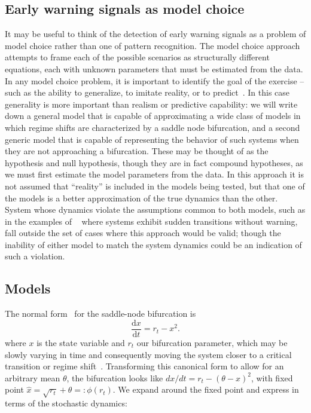 \documentclass[authoryear,review,11pt]{elsarticle}
\newcommand{\ud}{\mathrm{d}}
\begin{document}
\subsection*{Early warning signals as model choice}
It may be useful to think of the detection of early warning signals 
as a problem of model choice rather than one of pattern recognition.  
The model choice approach attempts to frame each of the possible scenarios as structurally different equations,
each with unknown parameters that must be estimated from the data.
In any model choice problem, it is important to identify the goal of the exercise --
such as the ability to generalize, to imitate reality, or to predict~\citep{Levins1966}.  
In this case generality is more important than realism or predictive capability: 
we will write down a general model that is capable of approximating
a wide class of models in which regime shifts are characterized by a saddle node bifurcation,
and a second generic model that is capable of representing the behavior of such systems
when they are not approaching a bifurcation.  
These may be thought of as the hypothesis and null hypothesis,
though they are in fact compound hypotheses,
as we must first estimate the model parameters from the data.  
In this approach it is not assumed that ``reality'' is included in the models being tested, 
but that one of the models is a better approximation of the true dynamics than the other.  
System whose dynamics violate the assumptions common to both models, 
such as in the examples of ~\citet{Hastings2010} where systems exhibit sudden transitions without warning, 
fall outside the set of cases where this approach would be valid; 
though the inability of either model to match the system dynamics could be an indication of such a violation.  


\subsection*{Models}
The normal form~\citep{Guckenheimer1983, Kuehn2011} for the saddle-node bifurcation is
\begin{equation}
\frac{\ud x}{\ud t} = r_t- x^2.
\label{saddle-node}
\end{equation}
where $x$ is the state variable and $r_t$ our bifurcation parameter, 
which may be slowly varying in time and 
consequently moving the system closer to a critical transition or regime shift~\citep{Scheffer2009}.  
Transforming this canonical form to allow for an arbitrary mean $\theta$,
the bifurcation looks like \( dx/dt = r_t- (\theta-x)^2 \), with fixed point \(\hat x = \sqrt{r_t} +\theta =: \phi(r_t)\).
We expand around the fixed point and express in terms of the stochastic dynamics: 
\end{document}
